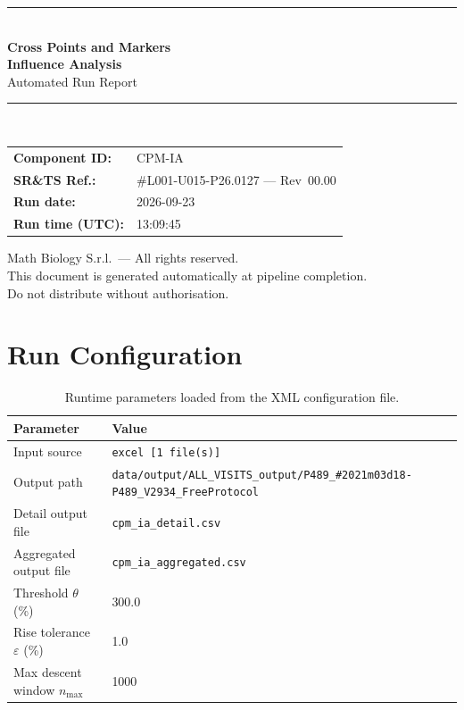 \documentclass[a4paper,11pt]{article}
\begin{document}
\begin{titlepage}
\begin{center}
  \vspace*{1.8cm}
  {\color{dmaaccent}\rule{\linewidth}{1.5pt}}\\[0.6cm]
  {\LARGE\bfseries\color{dmaaccent}
    Cross Points and Markers\\[0.25cm]
    Influence Analysis}\\[0.4cm]
  {\Large Automated Run Report}\\[0.3cm]
  {\color{dmaaccent}\rule{\linewidth}{1.5pt}}\\[2cm]

  \begin{tabular}{ll}
    \textbf{Component ID:}   & CPM-IA \\[0.3cm]
    \textbf{SR\&TS Ref.:}    & \#L001-U015-P26.0127 --- Rev~00.00 \\[0.3cm]
    \textbf{Run date:}       & 2026-09-23 \\[0.3cm]
    \textbf{Run time (UTC):} & 13:09:45 \\
  \end{tabular}

  \vfill
  {\color{dmagray}\small
    Math Biology S.r.l.\ --- All rights reserved.\\
    This document is generated automatically at pipeline completion.\\
    Do not distribute without authorisation.}
\end{center}
\end{titlepage}

\tableofcontents
\clearpage

\section{Run Configuration}

\begin{table}[h!]
\centering
\small
\caption{Runtime parameters loaded from the XML configuration file.}
\begin{tabular}{ll}
\toprule
\textbf{Parameter} & \textbf{Value} \\
\midrule
Input source                      & \texttt{excel [1 file(s)]} \\
Output path                       & \texttt{data/output/ALL\_VISITS\_output/P489\_\#2021m03d18-P489\_V2934\_FreeProtocol} \\
Detail output file                & \texttt{cpm\_ia\_detail.csv} \\
Aggregated output file            & \texttt{cpm\_ia\_aggregated.csv} \\
Threshold $\theta$ (\%)           & 300.0 \\
Rise tolerance $\varepsilon$ (\%) & 1.0 \\
Max descent window $n_{\max}$     & 1000 \\
\bottomrule
\end{tabular}
\end{table}
\end{document}
